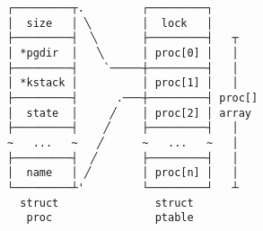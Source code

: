 \documentclass[varwidth,crop]{standalone}
\begin{document}
\begin{verbatim}
┌─────────┬.         ┌─────────┐
│  size   │ ╲        │  lock   │
├─────────┤  ╲       ├─────────┤   ┬
│ *pgdir  │   ╲      │ proc[0] │   │
├─────────┤    `─────┼─────────┤   │
│ *kstack │          │ proc[1] │   │
├─────────┤      .───┼─────────┤ proc[]
│  state  │     ╱    │ proc[2] │ array
├─────────┤    ╱     ├─────────┤   │
~   ...   ~   ╱      ~   ...   ~   │
├─────────┤  ╱       ├─────────┤   │
│  name   │ ╱        │ proc[n] │   │
└─────────┴'         └─────────┘   ┴
  struct               struct
   proc                ptable
\end{verbatim}
\end{document}
